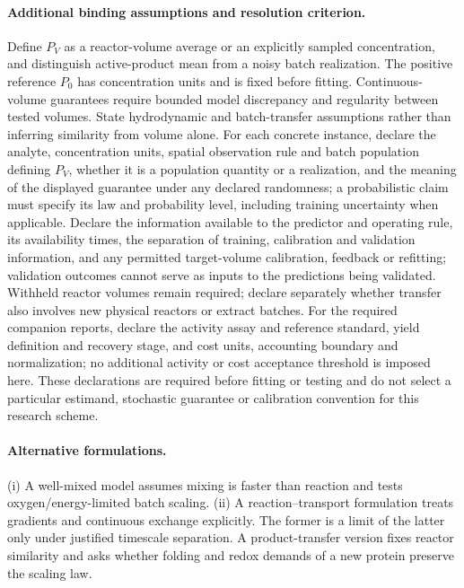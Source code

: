 \documentclass[11pt]{article}
\begin{document}
\paragraph{Additional binding assumptions and resolution criterion.} Define $P_V$ as a reactor-volume average or an explicitly sampled concentration, and distinguish active-product mean from a noisy batch realization. The positive reference $P_0$ has concentration units and is fixed before fitting. Continuous-volume guarantees require bounded model discrepancy and regularity between tested volumes. State hydrodynamic and batch-transfer assumptions rather than inferring similarity from volume alone. For each concrete instance, declare the analyte, concentration units, spatial observation rule and batch population defining $P_V$, whether it is a population quantity or a realization, and the meaning of the displayed guarantee under any declared randomness; a probabilistic claim must specify its law and probability level, including training uncertainty when applicable. Declare the information available to the predictor and operating rule, its availability times, the separation of training, calibration and validation information, and any permitted target-volume calibration, feedback or refitting; validation outcomes cannot serve as inputs to the predictions being validated. Withheld reactor volumes remain required; declare separately whether transfer also involves new physical reactors or extract batches. For the required companion reports, declare the activity assay and reference standard, yield definition and recovery stage, and cost units, accounting boundary and normalization; no additional activity or cost acceptance threshold is imposed here. These declarations are required before fitting or testing and do not select a particular estimand, stochastic guarantee or calibration convention for this research scheme.

\paragraph{Alternative formulations.} (i) A well-mixed model assumes mixing is faster than reaction and tests oxygen/energy-limited batch scaling. (ii) A reaction--transport formulation treats gradients and continuous exchange explicitly. The former is a limit of the latter only under justified timescale separation. A product-transfer version fixes reactor similarity and asks whether folding and redox demands of a new protein preserve the scaling law.
\end{document}
